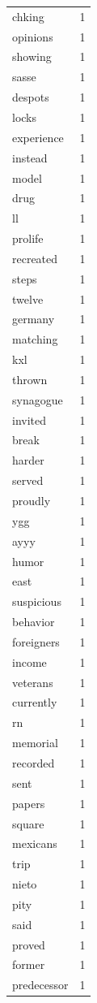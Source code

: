 \begin{tabular}{lr}
chking & 1 \\
opinions & 1 \\
showing & 1 \\
sasse & 1 \\
despots & 1 \\
locks & 1 \\
experience & 1 \\
instead & 1 \\
model & 1 \\
drug & 1 \\
ll & 1 \\
prolife & 1 \\
recreated & 1 \\
steps & 1 \\
twelve & 1 \\
germany & 1 \\
matching & 1 \\
kxl & 1 \\
thrown & 1 \\
synagogue & 1 \\
invited & 1 \\
break & 1 \\
harder & 1 \\
served & 1 \\
proudly & 1 \\
ygg & 1 \\
ayyy & 1 \\
humor & 1 \\
east & 1 \\
suspicious & 1 \\
behavior & 1 \\
foreigners & 1 \\
income & 1 \\
veterans & 1 \\
currently & 1 \\
rn & 1 \\
memorial & 1 \\
recorded & 1 \\
sent & 1 \\
papers & 1 \\
square & 1 \\
mexicans & 1 \\
trip & 1 \\
nieto & 1 \\
pity & 1 \\
said & 1 \\
proved & 1 \\
former & 1 \\
predecessor & 1 \\

\end{tabular}
